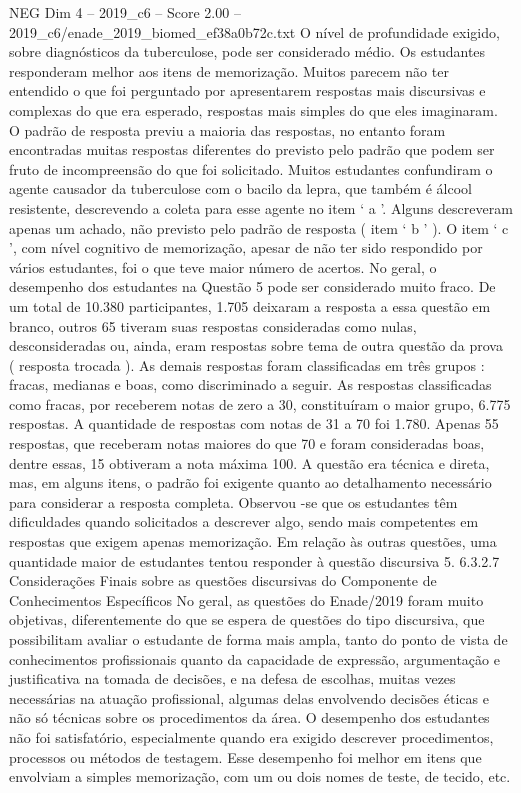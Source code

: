 \begin{textsample}{NEG Dim 4 – 2019\_c6 – Score 2.00 – 2019\_c6/enade\_2019\_biomed\_ef38a0b72c.txt}
O nível de profundidade exigido, sobre diagnósticos da tuberculose, pode ser considerado médio.
Os estudantes responderam melhor aos itens de memorização.
Muitos parecem não ter entendido o que foi perguntado por apresentarem respostas mais discursivas e complexas do que era esperado, respostas mais simples do que eles imaginaram.
O padrão de resposta previu a maioria das respostas, no entanto foram encontradas muitas respostas diferentes do previsto pelo padrão que podem ser fruto de incompreensão do que foi solicitado.
Muitos estudantes confundiram o agente causador da tuberculose com o bacilo da lepra, que também é álcool resistente, descrevendo a coleta para esse agente no item ‘ a ’.
Alguns descreveram apenas um achado, não previsto pelo padrão de resposta ( item ‘ b ’ ).
O item ‘ c ’, com nível cognitivo de memorização, apesar de não ter sido respondido por vários estudantes, foi o que teve maior número de acertos.
No geral, o desempenho dos estudantes na Questão 5 pode ser considerado muito fraco.
De um total de 10.380 participantes, 1.705 deixaram a resposta a essa questão em branco, outros 65 tiveram suas respostas consideradas como nulas, desconsideradas ou, ainda, eram respostas sobre tema de outra questão da prova ( resposta trocada ).
As demais respostas foram classificadas em três grupos : fracas, medianas e boas, como discriminado a seguir.
As respostas classificadas como fracas, por receberem notas de zero a 30, constituíram o maior grupo, 6.775 respostas.
A quantidade de respostas com notas de 31 a 70 foi 1.780.
Apenas 55 respostas, que receberam notas maiores do que 70 e foram consideradas boas, dentre essas, 15 obtiveram a nota máxima 100.
A questão era técnica e direta, mas, em alguns itens, o padrão foi exigente quanto ao detalhamento necessário para considerar a resposta completa.
Observou -se que os estudantes têm dificuldades quando solicitados a descrever algo, sendo mais competentes em respostas que exigem apenas memorização.
Em relação às outras questões, uma quantidade maior de estudantes tentou responder à questão discursiva 5. 6.3.2.7 Considerações Finais sobre as questões discursivas do Componente de Conhecimentos Específicos No geral, as questões do Enade/2019 foram muito objetivas, diferentemente do que se espera de questões do tipo discursiva, que possibilitam avaliar o estudante de forma mais ampla, tanto do ponto de vista de conhecimentos profissionais quanto da capacidade de expressão, argumentação e justificativa na tomada de decisões, e na defesa de escolhas, muitas vezes necessárias na atuação profissional, algumas delas envolvendo decisões éticas e não só técnicas sobre os procedimentos da área.
O desempenho dos estudantes não foi satisfatório, especialmente quando era exigido descrever procedimentos, processos ou métodos de testagem.
Esse desempenho foi melhor em itens que envolviam a simples memorização, com um ou dois nomes de teste, de tecido, etc.

\end{textsample}
